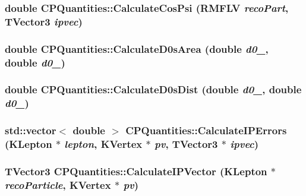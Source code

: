 \label{classCPQuantities_a89656a406f278bdda8cadea631bee6aa}
\hypertarget{classCPQuantities_a115b55637b473bdab3941eadb1cf5b55}{
\subsubsection[{CalculateCosPsi}]{\setlength{\rightskip}{0pt plus 5cm}double CPQuantities::CalculateCosPsi (RMFLV {\em recoPart}, \/  TVector3 {\em ipvec})}}
\label{classCPQuantities_a115b55637b473bdab3941eadb1cf5b55}
\hypertarget{classCPQuantities_a03e5be1168d4cea8c65b74640570cc0c}{
\subsubsection[{CalculateD0sArea}]{\setlength{\rightskip}{0pt plus 5cm}double CPQuantities::CalculateD0sArea (double {\em d0\_}, \/  double {\em d0\_})}}
\label{classCPQuantities_a03e5be1168d4cea8c65b74640570cc0c}
\hypertarget{classCPQuantities_ae45f7a1f234b3a6bff9d6afeeb769a16}{
\subsubsection[{CalculateD0sDist}]{\setlength{\rightskip}{0pt plus 5cm}double CPQuantities::CalculateD0sDist (double {\em d0\_}, \/  double {\em d0\_})}}
\label{classCPQuantities_ae45f7a1f234b3a6bff9d6afeeb769a16}
\hypertarget{classCPQuantities_a692317cc0e1ca420fda665230c58b5b6}{
\subsubsection[{CalculateIPErrors}]{\setlength{\rightskip}{0pt plus 5cm}std::vector$<$ double $>$ CPQuantities::CalculateIPErrors (KLepton $\ast$ {\em lepton}, \/  KVertex $\ast$ {\em pv}, \/  TVector3 $\ast$ {\em ipvec})}}
\label{classCPQuantities_a692317cc0e1ca420fda665230c58b5b6}
\hypertarget{classCPQuantities_a7cba8aa116e58892d0ecca846e8b8f08}{
\subsubsection[{CalculateIPVector}]{\setlength{\rightskip}{0pt plus 5cm}TVector3 CPQuantities::CalculateIPVector (KLepton $\ast$ {\em recoParticle}, \/  KVertex $\ast$ {\em pv})}}
